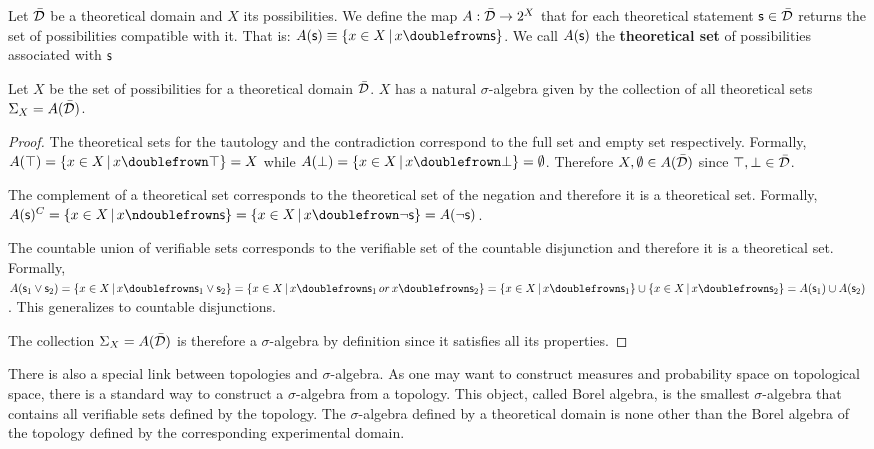 \documentclass[11pt,letterpaper,fleqn]{memoir} %
\begin{document}
\begin{mathSection}
	
	\begin{defn}
		Let $\bar{\mathcal{D}}$ be a theoretical domain and $X$ its possibilities. We define the map $A : \bar{\mathcal{D}} \rightarrow 2^X$ that for each theoretical statement $\mathsf{s} \in \bar{\mathcal{D}}$ returns the set of possibilities compatible with it. That is: $A(\stmt)\equiv\{ x \in X \, | \, x \comp \stmt\}$. We call $A(\mathsf{s})$ the \textbf{theoretical set} of possibilities associated with $\mathsf{s}$
	\end{defn}
	
	\begin{prop}
		Let $X$ be the set of possibilities for a theoretical domain $\bar{\mathcal{D}}$. $X$ has a natural $\sigma$-algebra given by the collection of all theoretical sets $\Sigma_X=A(\bar{\mathcal{D}})$.
	\end{prop}
	
	\begin{proof}
	The theoretical sets for the tautology and the contradiction correspond to the full set and empty set respectively. Formally, $A(\tautology) = \{ x \in X \, | \, x \comp \tautology\} = X$ while $A(\contradiction) = \{ x \in X \, | \, x \comp \contradiction\} = \emptyset$. Therefore $X, \emptyset \in A(\bar{\mathcal{D}})$ since $\top, \bot \in \bar{\mathcal{D}}$.

	The complement of a theoretical set corresponds to the theoretical set of the negation and therefore it is a theoretical set. Formally, $A(\stmt)^C = \{ x \in X \, | \, x \ncomp \stmt\} =  \{ x \in X \, | \, x \comp \NOT\stmt\} = A(\NOT\stmt)$.

	The countable union of verifiable sets corresponds to the verifiable set of the countable disjunction and therefore it is a theoretical set. Formally, $A(\stmt_1\OR\stmt_2) = \{ x \in X \, | \, x \comp \stmt_1\OR\stmt_2\} =  \{ x \in X \, | \, x \comp \stmt_1 \, or \, x \comp \stmt_2\} = \{ x \in X \, | \, x \comp \stmt_1\} \cup \{ x \in X \, | \, x \comp \stmt_2\} = A(\stmt_1) \cup A(\stmt_2)$. This generalizes to countable disjunctions.

	The collection $\Sigma_X=A(\bar{\mathcal{D}})$ is therefore a $\sigma$-algebra by definition since it satisfies all its properties.
	\end{proof}
\end{mathSection}

There is also a special link between topologies and $\sigma$-algebra. As one may want to construct measures and probability space on topological space, there is a standard way to construct a $\sigma$-algebra from a topology. This object, called Borel algebra, is the smallest $\sigma$-algebra that contains all verifiable sets defined by the topology. The $\sigma$-algebra defined by a theoretical domain is none other than the Borel algebra of the topology defined by the corresponding experimental domain.
\end{document}
